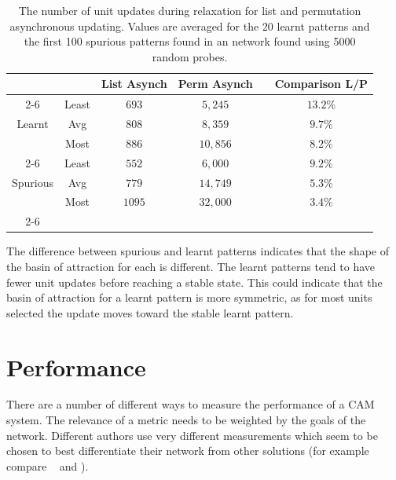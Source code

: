 \begin{table}[ht]
	\center
		\begin{tabular}{cc|c|c|c|c|}
			&&List Asynch &Perm Asynch &&Comparison L/P\\
			\cline{2-6}	
						&Least&$693$&$5,245$&&$13.2\%$\\
			Learnt&Avg	&$808$&$8,359$&&$9.7\%$\\
						&Most	&$886$&$10,856$&&$8.2\%$\\
			\cline{2-6}
							&Least&$552$&$6,000$&&$9.2\%$\\
			Spurious&Avg	&$779$&$14,749$&&$5.3\%$\\
							&Most	&$1095$&$32,000$&&$3.4\%$\\
			\cline{2-6}			
		\end{tabular}
	\center
	\caption{The number of unit updates during relaxation for list and permutation asynchronous updating. Values are averaged for the 20 learnt patterns and the first 100 spurious patterns found in an  network found using 5000 random probes.}
	\label{tab:relaxationCycles}
\end{table}

The difference between spurious and learnt patterns indicates that the shape of the basin of attraction for each is different.  The learnt patterns tend to have fewer unit updates before reaching a stable state.  This could indicate that the basin of attraction for a learnt pattern is more symmetric, as for most units selected the update moves toward the stable learnt pattern.  



\section{Performance}
\label{sec:performance}
There are a number of different ways to measure the performance of a CAM system. The relevance of a metric needs to be weighted by the goals of the network.
Different authors use very different measurements which seem to be chosen to
best differentiate their network from other solutions (for example compare ~\citet{Christos96} and \citet{vanHemmen1997}).
 
